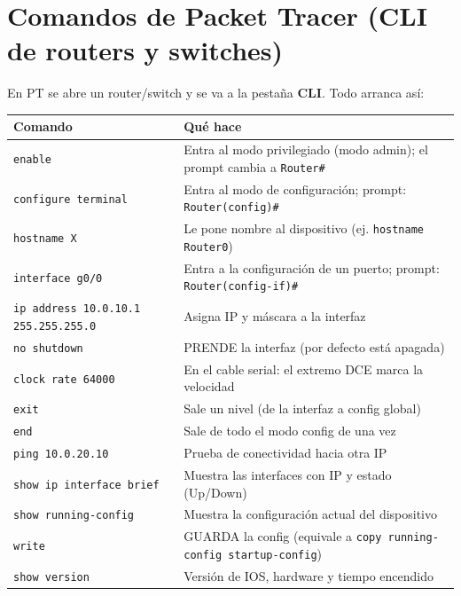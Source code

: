 \section{Comandos de Packet Tracer (CLI de routers y switches)}

En PT se abre un router/switch y se va a la pestaña \textbf{CLI}. Todo arranca así:

\begin{center}
\begin{tabularx}{\textwidth}{lX}
  \toprule
  \textbf{Comando} & \textbf{Qué hace} \\
  \midrule
  \texttt{enable} & Entra al modo privilegiado (modo admin); el prompt cambia a \texttt{Router\#} \\
  \texttt{configure terminal} & Entra al modo de configuración; prompt: \texttt{Router(config)\#} \\
  \texttt{hostname X} & Le pone nombre al dispositivo (ej. \texttt{hostname Router0}) \\
  \texttt{interface g0/0} & Entra a la configuración de un puerto; prompt: \texttt{Router(config-if)\#} \\
  \texttt{ip address 10.0.10.1 255.255.255.0} & Asigna IP y máscara a la interfaz \\
  \texttt{no shutdown} & PRENDE la interfaz (por defecto está apagada) \\
  \texttt{clock rate 64000} & En el cable serial: el extremo DCE marca la velocidad \\
  \texttt{exit} & Sale un nivel (de la interfaz a config global) \\
  \texttt{end} & Sale de todo el modo config de una vez \\
  \texttt{ping 10.0.20.10} & Prueba de conectividad hacia otra IP \\
  \texttt{show ip interface brief} & Muestra las interfaces con IP y estado (Up/Down) \\
  \texttt{show running-config} & Muestra la configuración actual del dispositivo \\
  \texttt{write} & GUARDA la config (equivale a \texttt{copy running-config startup-config}) \\
  \texttt{show version} & Versión de IOS, hardware y tiempo encendido \\
  \bottomrule
\end{tabularx}
\end{center}

